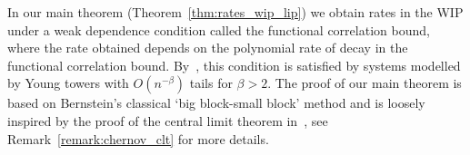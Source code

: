 \documentclass[11pt,a4paper,reqno,oneside]{amsart}
\theoremstyle{definition}
\theoremstyle{remark}
\numberwithin{equation}{section}
\begin{document}
In our main theorem (Theorem~\ref{thm:rates_wip_lip}) we obtain rates in the WIP under a weak dependence condition called the functional correlation bound, where the rate obtained depends on the polynomial rate of decay in the functional correlation bound. By~\cite{fleming2022}, this condition is satisfied by systems modelled by Young towers with $O(n^{-\beta})$ tails for $\beta>2$. The proof of our main theorem is based on Bernstein's classical `big block-small block' method and is loosely inspired by the proof of the central limit theorem in~\cite[Section 7.8]{chernov_markarian}, see Remark~\ref{remark:chernov_clt} for more details.
\end{document}
